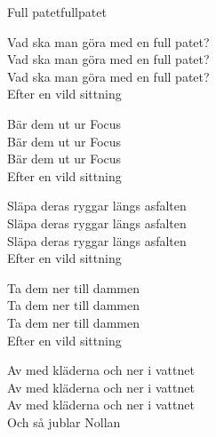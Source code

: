 \begin{song}{Full patet}{fullpatet}
\begin{vers}
Vad ska man göra med en full patet?\\
Vad ska man göra med en full patet?\\
Vad ska man göra med en full patet?\\
Efter en vild sittning\\
\end{vers}

\begin{vers}
Bär dem ut ur Focus\\
Bär dem ut ur Focus\\
Bär dem ut ur Focus\\
Efter en vild sittning\\
\end{vers}

\begin{vers}
Släpa deras ryggar längs asfalten\\
Släpa deras ryggar längs asfalten\\
Släpa deras ryggar längs asfalten\\
Efter en vild sittning
\end{vers}

\begin{vers}
Ta dem ner till dammen\\
Ta dem ner till dammen\\
Ta dem ner till dammen\\
Efter en vild sittning\\
\end{vers}

\begin{vers}
Av med kläderna och ner i vattnet\\
Av med kläderna och ner i vattnet\\
Av med kläderna och ner i vattnet\\
Och så jublar Nollan\\
\end{vers}
\end{song}